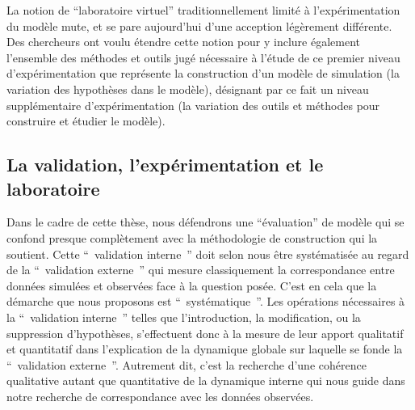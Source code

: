 La notion de \enquote{laboratoire virtuel} traditionnellement limité à l'expérimentation du modèle mute, et se pare aujourd'hui d'une acception légèrement différente. Des chercheurs \autocite{Schmitt2014} \autocite{Amblard2003} ont voulu étendre cette notion pour y inclure également l'ensemble des méthodes et outils jugé nécessaire à l'étude de ce premier niveau d'expérimentation que représente la construction d'un modèle de simulation (la variation des hypothèses dans le modèle), désignant par ce fait un niveau supplémentaire d’expérimentation (la variation des outils et méthodes pour construire et étudier le modèle). 



\subsection{La validation, l'expérimentation et le laboratoire}

Dans le cadre de cette thèse, nous défendrons une \enquote{évaluation} de modèle qui se confond presque complètement avec la méthodologie de construction qui la soutient. Cette \enquote{ validation interne } doit selon nous être systématisée au regard de la \enquote{ validation externe } qui mesure classiquement la correspondance entre données simulées et observées face à la question posée. C’est en cela que la démarche que nous proposons est \enquote{ systématique }. Les opérations nécessaires à la \enquote{ validation interne } telles que l'introduction, la modification, ou la suppression d'hypothèses, s’effectuent donc à la mesure de leur apport qualitatif et quantitatif dans l'explication de la dynamique globale sur laquelle se fonde la \enquote{ validation externe }. Autrement dit, c'est la recherche d'une cohérence qualitative autant que quantitative de la dynamique interne qui nous guide dans notre recherche de correspondance avec les données observées.

